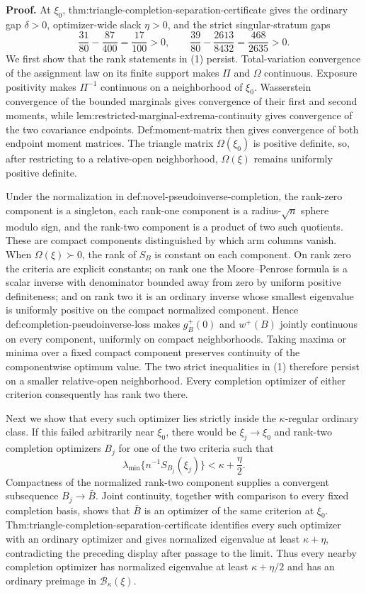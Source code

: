 \textbf{Proof.}
At \(\xi_0\), thm:triangle-completion-separation-certificate gives the ordinary gap \(\delta>0\), optimizer-wide slack \(\eta>0\), and the strict singular-stratum gaps
\[
\frac{31}{80}-\frac{87}{400}=\frac{17}{100}>0,
\qquad
\frac{39}{80}-\frac{2613}{8432}=\frac{468}{2635}>0.                 \tag{1}
\]
We first show that the rank statements in (1) persist.  Total-variation convergence of the assignment law on its finite support makes \(\Pi\) and \(\Omega\) continuous.  Exposure positivity makes \(\Pi^{-1}\) continuous on a neighborhood of \(\xi_0\).  Wasserstein convergence of the bounded marginals gives convergence of their first and second moments, while lem:restricted-marginal-extrema-continuity gives convergence of the two covariance endpoints.  Def:moment-matrix then gives convergence of both endpoint moment matrices.  The triangle matrix \(\Omega(\xi_0)\) is positive definite, so, after restricting to a relative-open neighborhood, \(\Omega(\xi)\) remains uniformly positive definite.

Under the normalization in def:novel-pseudoinverse-completion, the rank-zero component is a singleton, each rank-one component is a radius-\(\sqrt n\) sphere modulo sign, and the rank-two component is a product of two such quotients.  These are compact components distinguished by which arm columns vanish.  When \(\Omega(\xi)\succ0\), the rank of \(S_B\) is constant on each component.  On rank zero the criteria are explicit constants; on rank one the Moore--Penrose formula is a scalar inverse with denominator bounded away from zero by uniform positive definiteness; and on rank two it is an ordinary inverse whose smallest eigenvalue is uniformly positive on the compact normalized component.  Hence def:completion-pseudoinverse-loss makes \(g_B^+(0)\) and \(w^+(B)\) jointly continuous on every component, uniformly on compact neighborhoods.  Taking maxima or minima over a fixed compact component preserves continuity of the componentwise optimum value.  The two strict inequalities in (1) therefore persist on a smaller relative-open neighborhood.  Every completion optimizer of either criterion consequently has rank two there.

Next we show that every such optimizer lies strictly inside the \(\kappa\)-regular ordinary class.  If this failed arbitrarily near \(\xi_0\), there would be \(\xi_j\to\xi_0\) and rank-two completion optimizers \(B_j\) for one of the two criteria such that
\[
\lambda_{\min}\{n^{-1}S_{B_j}(\xi_j)\}<\kappa+\frac\eta2.
\]
Compactness of the normalized rank-two component supplies a convergent subsequence \(B_j\to\bar B\).  Joint continuity, together with comparison to every fixed completion basis, shows that \(\bar B\) is an optimizer of the same criterion at \(\xi_0\).  Thm:triangle-completion-separation-certificate identifies every such optimizer with an ordinary optimizer and gives normalized eigenvalue at least \(\kappa+\eta\), contradicting the preceding display after passage to the limit.  Thus every nearby completion optimizer has normalized eigenvalue at least \(\kappa+\eta/2\) and has an ordinary preimage in \(\mathcal B_\kappa(\xi)\).

